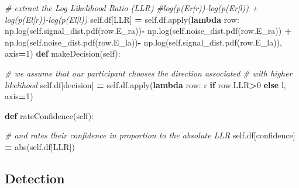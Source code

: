 \documentclass[12pt,twoside]{reedthesis}
\newenvironment{Shaded}{\begin{snugshade}}{\end{snugshade}}
\newcommand{\BuiltInTok}[1]{#1}
\newcommand{\CommentTok}[1]{\textcolor[rgb]{0.56,0.35,0.01}{\textit{#1}}}
\newcommand{\ControlFlowTok}[1]{\textcolor[rgb]{0.13,0.29,0.53}{\textbf{#1}}}
\newcommand{\DecValTok}[1]{\textcolor[rgb]{0.00,0.00,0.81}{#1}}
\newcommand{\KeywordTok}[1]{\textcolor[rgb]{0.13,0.29,0.53}{\textbf{#1}}}
\newcommand{\NormalTok}[1]{#1}
\newcommand{\OperatorTok}[1]{\textcolor[rgb]{0.81,0.36,0.00}{\textbf{#1}}}
\newcommand{\StringTok}[1]{\textcolor[rgb]{0.31,0.60,0.02}{#1}}
\newcommand{\VariableTok}[1]{\textcolor[rgb]{0.00,0.00,0.00}{#1}}
\begin{document}
\begin{Shaded}
\begin{Highlighting}[]
        \CommentTok{\# extract the Log Likelihood Ratio (LLR) }
        \CommentTok{\#log(p(Er|r)){-}log(p(Er|l)) + log(p(El|r)){-}log(p(El|l))}
        \VariableTok{self}\NormalTok{.df[}\StringTok{\textquotesingle{}LLR\textquotesingle{}}\NormalTok{] }\OperatorTok{=} \VariableTok{self}\NormalTok{.df.}\BuiltInTok{apply}\NormalTok{(}\KeywordTok{lambda}\NormalTok{ row: }
\NormalTok{               np.log(}\VariableTok{self}\NormalTok{.signal\_dist.pdf(row.E\_ra))}\OperatorTok{{-}} 
\NormalTok{               np.log(}\VariableTok{self}\NormalTok{.noise\_dist.pdf(row.E\_ra)) }\OperatorTok{+} 
\NormalTok{               np.log(}\VariableTok{self}\NormalTok{.noise\_dist.pdf(row.E\_la))}\OperatorTok{{-}} 
\NormalTok{               np.log(}\VariableTok{self}\NormalTok{.signal\_dist.pdf(row.E\_la)), axis}\OperatorTok{=}\DecValTok{1}\NormalTok{)}
    \KeywordTok{def}\NormalTok{ makeDecision(}\VariableTok{self}\NormalTok{):}
        
        \CommentTok{\# we assume that our participant chooses the direction associated }
        \CommentTok{\# with higher likelihood}
        \VariableTok{self}\NormalTok{.df[}\StringTok{\textquotesingle{}decision\textquotesingle{}}\NormalTok{] }\OperatorTok{=}  \VariableTok{self}\NormalTok{.df.}\BuiltInTok{apply}\NormalTok{(}\KeywordTok{lambda}\NormalTok{ row: }
                                             \StringTok{\textquotesingle{}r\textquotesingle{}} \ControlFlowTok{if}\NormalTok{ row.LLR}\OperatorTok{\textgreater{}}\DecValTok{0} \ControlFlowTok{else} \StringTok{\textquotesingle{}l\textquotesingle{}}\NormalTok{, }
\NormalTok{                                             axis}\OperatorTok{=}\DecValTok{1}\NormalTok{)}
        
    \KeywordTok{def}\NormalTok{ rateConfidence(}\VariableTok{self}\NormalTok{):}
        
        \CommentTok{\# and rates their confidence in proportion to the absolute LLR}
        \VariableTok{self}\NormalTok{.df[}\StringTok{\textquotesingle{}confidence\textquotesingle{}}\NormalTok{] }\OperatorTok{=} \BuiltInTok{abs}\NormalTok{(}\VariableTok{self}\NormalTok{.df[}\StringTok{\textquotesingle{}LLR\textquotesingle{}}\NormalTok{])}
\end{Highlighting}
\end{Shaded}
\hypertarget{detection-2}{%
\subsection{Detection}\label{detection-2}}
\end{document}
